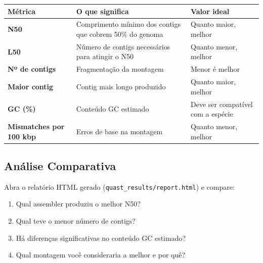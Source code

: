 \documentclass[
  brazilian,
  letterpaper,
  DIV=11,
  numbers=noendperiod]{scrartcl}
\newcounter{none} %
\providecommand{\tightlist}{%
  \setlength{\itemsep}{0pt}\setlength{\parskip}{0pt}}
\begin{document}
{\def\LTcaptype{none} %
\begin{longtable}[]{@{}
  >{\raggedright\arraybackslash}p{}
  >{\raggedright\arraybackslash}p{}
  >{\raggedright\arraybackslash}p{}@{}}
\toprule\noalign{}
\begin{minipage}[b]{\linewidth}\raggedright
Métrica
\end{minipage} & \begin{minipage}[b]{\linewidth}\raggedright
O que significa
\end{minipage} & \begin{minipage}[b]{\linewidth}\raggedright
Valor ideal
\end{minipage} \\
\midrule\noalign{}
\endhead
\bottomrule\noalign{}
\endlastfoot
\textbf{N50} & Comprimento mínimo dos contigs que cobrem 50\% do genoma
& Quanto maior, melhor \\
\textbf{L50} & Número de contigs necessários para atingir o N50 & Quanto
menor, melhor \\
\textbf{Nº de contigs} & Fragmentação da montagem & Menor é melhor \\
\textbf{Maior contig} & Contig mais longo produzido & Quanto maior,
melhor \\
\textbf{GC (\%)} & Conteúdo GC estimado & Deve ser compatível com a
espécie \\
\textbf{Mismatches por 100 kbp} & Erros de base na montagem & Quanto
menor, melhor \\
\end{longtable}
}

\subsection{Análise Comparativa}\label{anuxe1lise-comparativa}

Abra o relatório HTML gerado (\texttt{quast\_results/report.html}) e
compare:

\begin{enumerate}
\def\labelenumi{\arabic{enumi}.}
\tightlist
\item
  Qual assembler produziu o melhor N50?
\item
  Qual teve o menor número de contigs?
\item
  Há diferenças significativas no conteúdo GC estimado?
\item
  Qual montagem você consideraria a melhor e por quê?
\end{enumerate}
\end{document}

